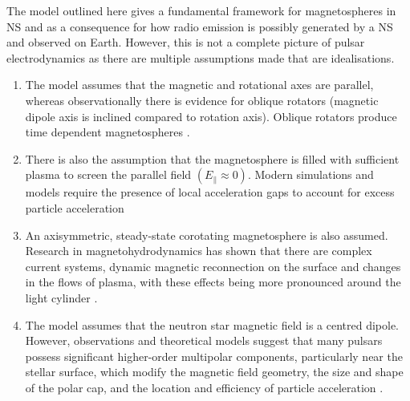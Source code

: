 The \citeauthor{goldreich_pulsar_1969} model outlined here gives a fundamental framework for magnetospheres in NS and as a consequence for how radio emission is possibly generated by a NS and observed on Earth. However, this is not a complete picture of pulsar electrodynamics as there are multiple assumptions made that are idealisations. 

\begin{enumerate}[label=(\roman*)]

\item The model assumes that the magnetic and rotational axes are parallel, whereas observationally there is evidence for oblique rotators (magnetic dipole axis is inclined compared to rotation axis). Oblique rotators produce time 
dependent magnetospheres \citep{philippov_ab_2015}.

\item There is also the assumption that the magnetosphere is filled with sufficient plasma to screen the parallel field $(E_\parallel\approx 0)$. Modern simulations and models require the presence of local acceleration gaps to account for excess particle acceleration \citep{ruderman_theory_1975,timokhin_polar_2015}

\item An axisymmetric, steady-state corotating magnetosphere is also assumed. Research in magnetohydrodynamics has shown that there are complex current systems, dynamic magnetic reconnection on the surface and changes in the flows of plasma, with these effects being more pronounced around the light cylinder \citep{spitkovsky_time-dependent_2006, philippov_ab_2015}. 

\item The model assumes that the neutron star magnetic field is a centred dipole. However, observations and theoretical models suggest that many pulsars possess significant higher-order multipolar components, particularly near the stellar surface, which modify the magnetic field geometry, the size and shape of the polar cap, and the location and efficiency of particle acceleration \citep{bilous_nicer_2019}.

\end{enumerate}



